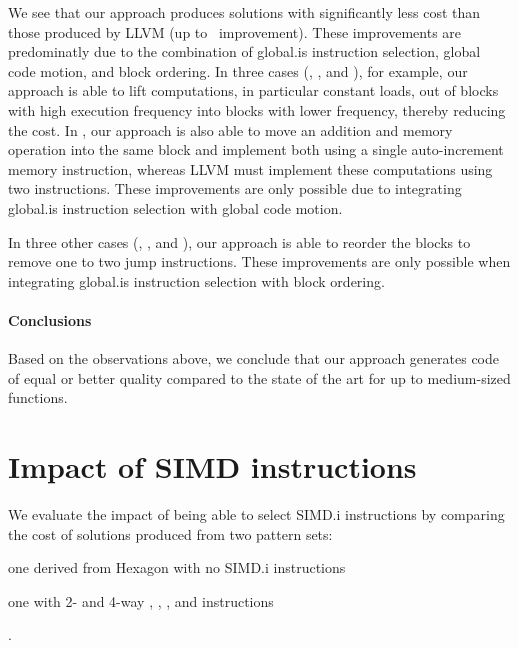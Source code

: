 We see that our approach produces \glspl{solution} with significantly less
cost than those produced by \gls{LLVM} (up to~\printSpeedup{%
  \UnisonVsLlvmHexagonFiveCyclesSpeedupCyclesZeroCenteredSpeedupMax%
} improvement).
%
These improvements are predominatly due to the combination of \gls{global.is}
\gls{instruction selection}, \gls{global code motion}, and \gls{block ordering}.
%
In three cases (, , and
), for example, our approach is able to lift computations, in
particular constant loads, out of \glspl{block} with high execution frequency
into \glspl{block} with lower frequency, thereby reducing the cost.
%
In , our approach is also able to move an addition and
memory operation into the same \gls{block} and implement both using a single
auto-increment memory \gls{instruction}, whereas \gls{LLVM} must implement these
computations using two \glspl{instruction}.
%
These improvements are only possible due to integrating \gls{global.is}
\gls{instruction selection} with \gls{global code motion}.

In three other cases (, ,
and ), our approach is able to reorder the
\glspl{block} to remove one to two jump \glspl{instruction}.
%
These improvements are only possible when integrating \gls{global.is}
\gls{instruction selection} with \gls{block ordering}.


\paragraph{Conclusions}

Based on the observations above, we conclude that our approach generates code of
equal or better quality compared to the state of the art for up to medium-sized
\glspl{function}.



\section{Impact of SIMD instructions}

We evaluate the impact of being able to select \gls{SIMD.i} \glspl{instruction}
by comparing the cost of \glspl{solution} produced from two \glspl{pattern set}:
%
\begin{patternList}
  \item {}
    one derived from \gls{Hexagon} with no \gls{SIMD.i} \glspl{instruction}
  \item {}
    one with \num{2}- and \num{4}-way , , ,
    and  \glspl{instruction}
\end{patternList}.


